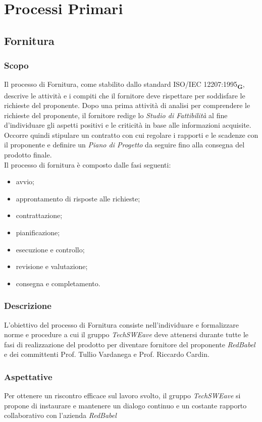 \section{Processi Primari}
\subsection{Fornitura}
\subsubsection{Scopo}
Il processo di Fornitura, come stabilito dallo standard ISO/IEC 12207:1995\textsubscript{\textbf{G}}, descrive le attività e i compiti che il fornitore deve rispettare per soddisfare le richieste del proponente. Dopo una prima attività di analisi per comprendere le richieste del proponente, il fornitore redige lo \textit{Studio di Fattibilità} al fine d'individuare gli aspetti positivi e le criticità in base alle informazioni acquisite. Occorre quindi stipulare un contratto con cui regolare i rapporti e le scadenze con il proponente e definire un \textit{Piano di Progetto} da seguire fino alla consegna del prodotto finale.
\\Il processo di fornitura è composto dalle fasi seguenti:
\begin{itemize}
    \item avvio;
    \item approntamento di risposte alle richieste;
    \item contrattazione;
    \item pianificazione;
    \item esecuzione e controllo;
    \item revisione e valutazione;
    \item consegna e completamento.
\end{itemize}
\subsubsection{Descrizione}
L'obiettivo del processo di Fornitura consiste nell'individuare e formalizzare norme e procedure a cui il gruppo \textit{TechSWEave} deve attenersi durante tutte le fasi di realizzazione del prodotto per diventare fornitore del proponente \textit{RedBabel} e dei committenti Prof. Tullio Vardanega e Prof. Riccardo Cardin.
\subsubsection{Aspettative}
Per ottenere un riscontro efficace sul lavoro svolto, il gruppo \textit{TechSWEave} si propone di
instaurare e mantenere un dialogo continuo e un costante rapporto collaborativo con l'azienda \textit{RedBabel}
